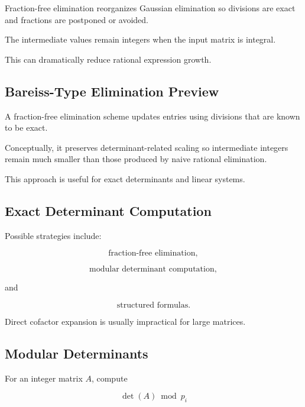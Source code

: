 Fraction-free elimination reorganizes Gaussian elimination so divisions
are exact and fractions are postponed or avoided.

The intermediate values remain integers when the input matrix is integral.

This can dramatically reduce rational expression growth.

\subsection{Bareiss-Type Elimination Preview}
\label{subsec:bareiss-elimination-preview}

A fraction-free elimination scheme updates entries using divisions that
are known to be exact.

Conceptually, it preserves determinant-related scaling so intermediate
integers remain much smaller than those produced by naive rational
elimination.

This approach is useful for exact determinants and linear systems.

\subsection{Exact Determinant Computation}
\label{subsec:exact-determinant}

Possible strategies include:

\[
\boxed{
\text{fraction-free elimination},
}
\]

\[
\boxed{
\text{modular determinant computation},
}
\]

and

\[
\boxed{
\text{structured formulas}.
}
\]

Direct cofactor expansion is usually impractical for large matrices.

\subsection{Modular Determinants}
\label{subsec:modular-determinants}

For an integer matrix \(A\), compute

\[
\det(A)
\bmod p_i
\]

